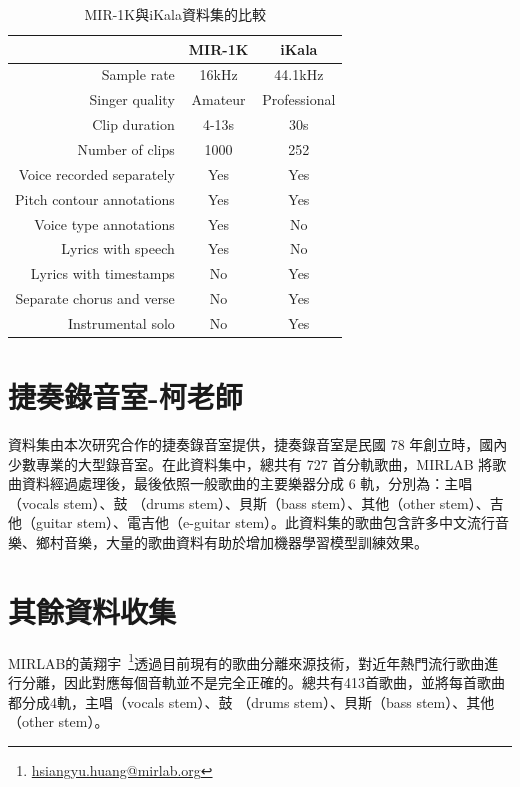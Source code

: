 \begin{table}[h!]
\centering
\begin{tabular}{|r|c|c|}
\hline
\textbf{}                 & \textbf{MIR-1K} & \textbf{iKala} \\ \hline
Sample rate               & 16kHz           & 44.1kHz        \\ \hline
Singer quality            & Amateur         & Professional   \\ \hline
Clip duration             & 4-13s           & 30s            \\ \hline
Number of clips           & 1000            & 252            \\ \hline
Voice recorded separately & Yes             & Yes            \\ \hline
Pitch contour annotations & Yes             & Yes            \\ \hline
Voice type annotations    & Yes             & No             \\ \hline
Lyrics with speech        & Yes             & No             \\ \hline
Lyrics with timestamps    & No              & Yes            \\ \hline
Separate chorus and verse & No              & Yes            \\ \hline
Instrumental solo         & No              & Yes            \\ \hline
\end{tabular}
\caption{MIR-1K與iKala資料集的比較}
\label{comp_mir_1k_with_ikala}
\end{table}

\section{捷奏錄音室-柯老師}
資料集由本次研究合作的捷奏錄音室提供，捷奏錄音室是民國 78 年創立時，國內少數專業的大型錄音室。在此資料集中，總共有 727 首分軌歌曲，MIRLAB 將歌曲資料經過處理後，最後依照一般歌曲的主要樂器分成 6 軌，分別為：主唱（vocals stem）、鼓 （drums stem）、貝斯（bass stem）、其他（other stem）、吉他（guitar stem）、電吉他（e-guitar stem）。此資料集的歌曲包含許多中文流行音樂、鄉村音樂，大量的歌曲資料有助於增加機器學習模型訓練效果。

\section{其餘資料收集}
MIRLAB的黃翔宇~\footnote{\url{hsiangyu.huang@mirlab.org}}透過目前現有的歌曲分離來源技術，對近年熱門流行歌曲進行分離，因此對應每個音軌並不是完全正確的。總共有413首歌曲，並將每首歌曲都分成4軌，主唱（vocals stem）、鼓 （drums stem）、貝斯（bass stem）、其他（other stem）。